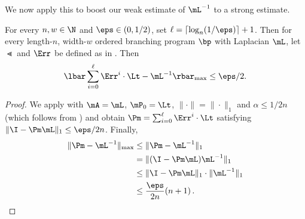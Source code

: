 We now apply this to boost our weak estimate of $\mL^{-1}$ to a strong estimate.
\begin{lemma}
\label{lem:pathStrongErr}
For every $n,w\in \N$ and $\eps \in (0,1/2)$, set $\ell=\lceil \log_{n}(1/\eps)\rceil+1$. Then for every length-$n$, width-$w$ ordered branching program $\bp$ with Laplacian $\mL$, let $\Lt$ and $\Err$ be defined as in . Then
$$\lbar\sum_{i=0}^{\ell}\Err^i\cdot \Lt-\mL^{-1}\rbar_{\max}\leq \eps/2.$$
\end{lemma}
\begin{proof}
We apply  with $\mA=\mL$, $\mP_0=\Lt$, $\|\cdot\|=\|\cdot\|_1$ and $\alpha\leq 1/2n$ (which follows from ) and obtain $\Pm=\sum_{i=0}^{\ell}\Err^i\cdot \Lt$ satisfying $\|\I-\Pm\mL\|_1\leq \eps/2n$. Finally,
\begin{align*}
    \|\Pm-\mL^{-1}\|_{\max} &\leq \|\Pm-\mL^{-1}\|_1\\ 
    &= \|(\I-\Pm \mL)\mL^{-1}\|_1\\
    &\leq \|\I-\Pm\mL\|_1\cdot \|\mL^{-1}\|_1\\
    &\leq \frac{\eps}{2n}(n+1)\,. \qedhere
\end{align*}
\end{proof}

